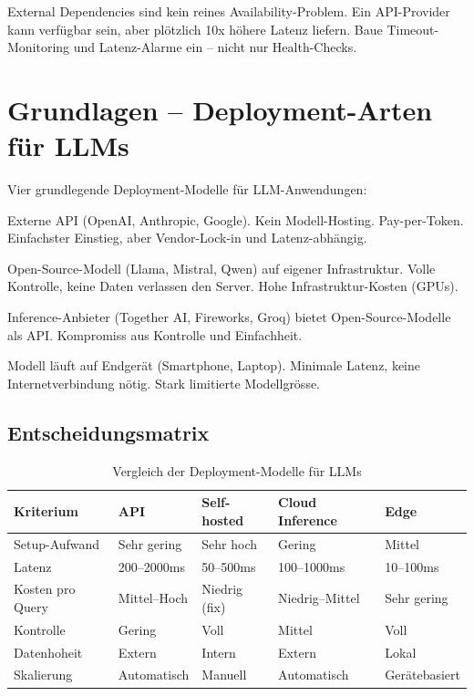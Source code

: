 \begin{praxishinweis}
External Dependencies sind kein reines Availability-Problem. Ein API-Provider kann verfügbar sein, aber plötzlich 10x höhere Latenz liefern. Baue Timeout-Monitoring und Latenz-Alarme ein -- nicht nur Health-Checks.
\end{praxishinweis}

\section{Grundlagen -- Deployment-Arten für LLMs}

Vier grundlegende Deployment-Modelle für LLM-Anwendungen:

\begin{description}[leftmargin=*,style=nextline]
    \item[API-basiert (Managed)] Externe API (OpenAI, Anthropic, Google). Kein Modell-Hosting. Pay-per-Token. Einfachster Einstieg, aber Vendor-Lock-in und Latenz-abhängig.
    \item[Self-hosted Open Source] Open-Source-Modell (Llama, Mistral, Qwen) auf eigener Infrastruktur. Volle Kontrolle, keine Daten verlassen den Server. Hohe Infrastruktur-Kosten (GPUs).
    \item[Managed Inference (Cloud)] Inference-Anbieter (Together AI, Fireworks, Groq) bietet Open-Source-Modelle als API. Kompromiss aus Kontrolle und Einfachheit.
    \item[Edge Deployment] Modell läuft auf Endgerät (Smartphone, Laptop). Minimale Latenz, keine Internetverbindung nötig. Stark limitierte Modellgrösse.
\end{description}

\subsection{Entscheidungsmatrix}

\begin{table}[H]
\centering
\begin{tabularx}{\linewidth}{lXXXX}
\toprule
\textbf{Kriterium} & \textbf{API} & \textbf{Self-hosted} & \textbf{Cloud Inference} & \textbf{Edge} \\
\midrule
Setup-Aufwand & Sehr gering & Sehr hoch & Gering & Mittel \\
Latenz & 200--2000ms & 50--500ms & 100--1000ms & 10--100ms \\
Kosten pro Query & Mittel--Hoch & Niedrig (fix) & Niedrig--Mittel & Sehr gering \\
Kontrolle & Gering & Voll & Mittel & Voll \\
Datenhoheit & Extern & Intern & Extern & Lokal \\
Skalierung & Automatisch & Manuell & Automatisch & Gerätebasiert \\
\bottomrule
\end{tabularx}
\caption{Vergleich der Deployment-Modelle für LLMs}
\end{table}

